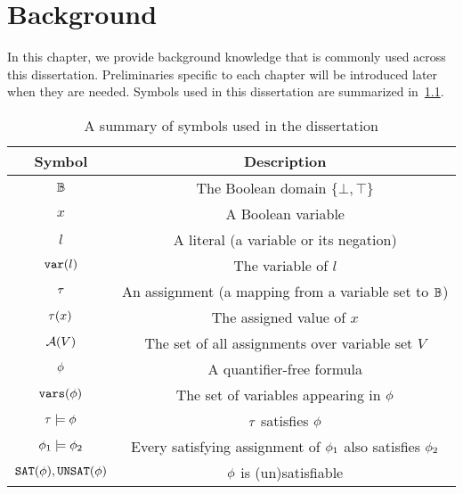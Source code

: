 \chapter{Background}
\label{chap:background}

In this chapter, we provide background knowledge that is commonly used across this dissertation.
Preliminaries specific to each chapter will be introduced later when they are needed.
Symbols used in this dissertation are summarized in~\cref{tbl:symbols}.

\begin{table}[t]
    \centering
    \caption{A summary of symbols used in the dissertation}
    \label{tbl:symbols}
    \begin{tabular}{c|c}
        Symbol                      & Description                                                   \\
        \hline
        $\mathbb{B}$                  & The Boolean domain $\{\bot,\top\}$                            \\
        $x$                         & A Boolean variable                                            \\
        $l$                         & A literal (a variable or its negation)                        \\
        $\mathtt{var}(l)$                    & The variable of $l$                                           \\
        $\tau$                       & An assignment (a mapping from a variable set to $\mathbb{B}$)   \\
        $\tau(x)$                    & The assigned value of $x$                                     \\
        $\mathcal{A}(V)$                    & The set of all assignments over variable set $V$              \\
        $\phi$                       & A quantifier-free formula                                     \\
        $\mathtt{vars}(\phi)$                  & The set of variables appearing in $\phi$                       \\
        $\tau\models\phi$             & $\tau$ satisfies $\phi$                                         \\
        $\phi_1\models\phi_2$         & Every satisfying assignment of $\phi_1$ also satisfies $\phi_2$ \\
        $\mathtt{SAT}(\phi),\mathtt{UNSAT}(\phi)$     & $\phi$ is (un)satisfiable                                      \\

\end{tabular}
\end{table}
